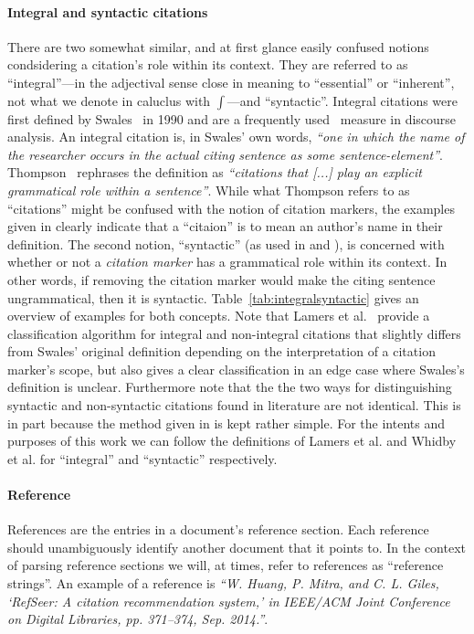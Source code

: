 \paragraph{Integral and syntactic citations} There are two somewhat similar, and at first glance easily confused notions condsidering a citation's role within its context. They are referred to as ``integral''---in the adjectival sense close in meaning to ``essential'' or ``inherent'', not what we denote in caluclus with $\int$---and ``syntactic''. Integral citations were first defined by Swales~\cite{Swales1990} in 1990 and are a frequently used~\cite{Hyland1999,Thompson2001,Okamura2008,Lamers2018} measure in discourse analysis. An integral citation is, in Swales' own words, \emph{``one in which the name of the researcher occurs in the actual citing sentence as some sentence-element''}. Thompson~\cite{Thompson2001} rephrases the definition as \emph{``citations that [...] play an explicit grammatical role within a sentence''}. While what Thompson refers to as ``citations'' might be confused with the notion of citation markers, the examples given in \cite{Thompson2001} clearly indicate that a ``citaion'' is to mean an author's name in their definition. The second notion, ``syntactic'' (as used in \cite{Whidby2011} and \cite{Abujbara2012}), is concerned with whether or not a \emph{citation marker} has a grammatical role within its context. In other words, if removing the citation marker would make the citing sentence ungrammatical, then it is syntactic. Table~\ref{tab:integralsyntactic} gives an overview of examples for both concepts. Note that Lamers et al.~\cite{Lamers2018} provide a classification algorithm for integral and non-integral citations that slightly differs from Swales' original definition depending on the interpretation of a citation marker's scope, but also gives a clear classification in an edge case where Swales's definition is unclear. Furthermore note that the the two ways for distinguishing syntactic and non-syntactic citations found in literature are not identical. This is in part because the method given in \cite{Abujbara2012} is kept rather simple. For the intents and purposes of this work we can follow the definitions of Lamers et al. and Whidby et al. for ``integral'' and ``syntactic'' respectively.
\paragraph{Reference} References are the entries in a document's reference section. Each reference should unambiguously identify another document that it points to. In the context of parsing reference sections we will, at times, refer to references as ``reference strings''. An example of a reference is \emph{``W. Huang, P. Mitra, and C. L. Giles, `RefSeer: A citation recommendation system,' in IEEE/ACM Joint Conference on Digital Libraries, pp. 371–374, Sep. 2014.''}.
